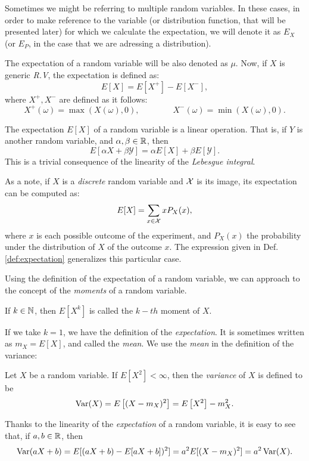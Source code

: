 Sometimes we might be referring to multiple random variables. In these cases, in order to make reference to the variable (or distribution function, that will be presented later) for which we calculate the expectation, we will denote it as $E_X$ (or $E_P$, in the case that we are adressing a distribution).

The expectation of a random variable will be also denoted as $\mu$. Now, if $X$ is generic \emph{R.V}, the expectation is defined as:
$$
E[X] = E[X^+] - E[X^-],
$$
where $X^+,X^-$ are defined as it follows:
$$
X^+(\omega) = \max(X(\omega),0), \quad \quad  \quad \quad X^-(\omega) = \min(X(\omega),0).
$$

The expectation $E[X]$ of a random variable is a linear operation. That is, if $Y$ is another random variable, and $\alpha,\beta \in \mathbb{R}$, then
$$
E[\alpha X + \beta \mathcal Y] = \alpha E[X] + \beta E[\mathcal Y].
$$
This is a trivial consequence of the linearity of the \emph{Lebesgue integral}.

As a note, if $X$ is a \emph{discrete} random variable and $\mathcal{X}$ is its image, its expectation can be computed as:
$$
E[X] = \sum_{x \in \mathcal{X}} x  P_X(x),
$$
where $x$ is each possible outcome of the experiment, and $P_X(x)$ the probability under the distribution of $X$ of the outcome $x$. 
The expression given in Def. \ref{def:expectation}  generalizes this particular case.

Using the definition of the expectation of a random variable, we can approach to the concept of the \emph{moments} of a random variable.

\begin{ndef}
If $k \in \mathbb N$, then $E[X^k]$ is called the $k-th$ moment of $X$.
\end{ndef}
If we take $k = 1$, we have the definition of the \emph{expectation}. It is sometimes written as $m_X = E[X]$, and called the \emph{mean}. We use the \emph{mean} in the definition of the variance:

\begin{ndef}
Let $X$ be a random variable. If $E\left[X^2\right] < \infty$, then the \emph{variance} of $X$ is defined to be
$$
\operatorname*{Var}(X) = E\left[(X - m_X)^2\right] = E\left[X^2\right] - m_X^2.
$$
\end{ndef}

Thanks to the linearity of the \emph{expectation} of a random variable, it is easy to see that, if $a,b \in \mathbb{R}$, then
$$
\operatorname*{Var}(aX + b) = E[(aX + b) - E[aX + b])^2] = a^2E[(X - m_X)^2] = a^2 \operatorname*{Var}(X).
$$



